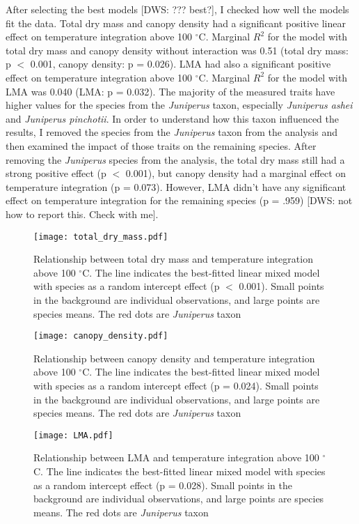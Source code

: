 \documentclass[12pt]{report}
\begin{document}
After selecting the best models [DWS: ??? best?], I checked how well the models fit the data. Total dry mass and canopy density had a significant positive linear effect on temperature integration above 100 $^{\circ}$C. Marginal $R^2$ for the model with total dry mass and canopy density without interaction was 0.51 (total dry mass: p $<$ 0.001, canopy density: p = 0.026). LMA had also a significant positive effect on temperature integration above 100 $^{\circ}$C. Marginal $R^2$ for the model with LMA was 0.040 (LMA: p = 0.032). The majority of the measured traits have higher values for the species from the \emph{Juniperus} taxon, especially \emph{Juniperus ashei} and \emph{Juniperus pinchotii}. In order to understand how this taxon influenced the results, I removed the species from the \emph{Juniperus} taxon from the analysis and then examined the impact of those traits on the remaining species. After removing the \emph{Juniperus} species from the analysis, the total dry mass still had a strong positive effect (p $<$ 0.001), but canopy density had a marginal effect on temperature integration (p = 0.073). However, LMA didn't have any significant effect on temperature integration for the remaining species (p = .959) [DWS: not how to report this. Check with me].


\begin{figure}
    \centering
    \texttt{[image: total\_dry\_mass.pdf]}
    \caption{Relationship between total dry mass and temperature integration above 100 $^{\circ}$C. The line indicates the best-fitted linear mixed model with species as a random intercept effect (p $<$ 0.001). Small points in the background are individual observations, and large points are species means. The red dots are \emph{Juniperus} taxon}
\end{figure}


\begin{figure}
    \centering
    \texttt{[image: canopy\_density.pdf]}
    \caption{Relationship between canopy density and temperature integration above 100 $^{\circ}$C. The line indicates the best-fitted linear mixed model with species as a random intercept effect (p = 0.024). Small points in the background are individual observations, and large points are species means. The red dots are \emph{Juniperus} taxon}
\end{figure}

\begin{figure}
    \centering
    \texttt{[image: LMA.pdf]}
    \caption{Relationship between LMA and temperature integration above 100 $^{\circ}$C. The line indicates the best-fitted linear mixed model with species as a random intercept effect (p = 0.028). Small points in the background are individual observations, and large points are species means. The red dots are \emph{Juniperus} taxon}
\end{figure}
\end{document}
